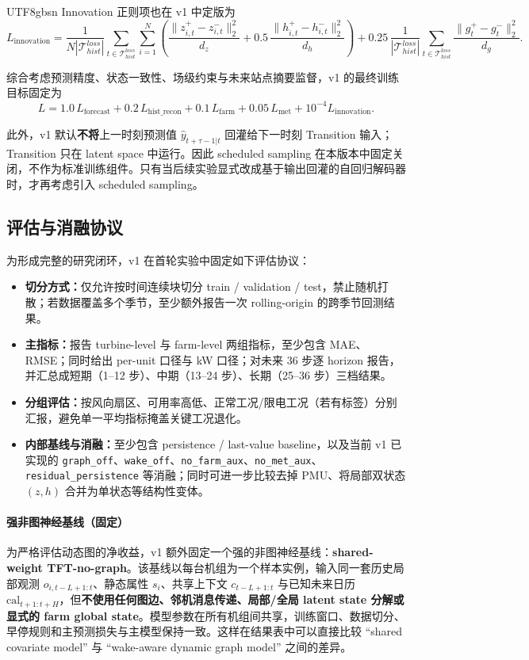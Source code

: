 \documentclass[11pt]{article}
\begin{document}
\begin{CJK}{UTF8}{gbsn}
Innovation 正则项也在 v1 中定版为
\[
L_{\mathrm{innovation}}
=
\frac{1}{N|\mathcal T_{hist}^{loss}|}
\sum_{t\in \mathcal T_{hist}^{loss}}\sum_{i=1}^{N}
\left(
\frac{\|z^+_{i,t}-z^-_{i,t}\|_2^2}{d_z}
+
0.5\,\frac{\|h^+_{i,t}-h^-_{i,t}\|_2^2}{d_h}
\right)
+
0.25\,\frac{1}{|\mathcal T_{hist}^{loss}|}
\sum_{t\in \mathcal T_{hist}^{loss}}
\frac{\|g_t^+-g_t^-\|_2^2}{d_g}.
\]

综合考虑预测精度、状态一致性、场级约束与未来站点摘要监督，v1 的最终训练目标固定为
\[
L
=
1.0\,L_{\mathrm{forecast}}
+0.2\,L_{\mathrm{hist\_recon}}
+0.1\,L_{\mathrm{farm}}
+0.05\,L_{\mathrm{met}}
+10^{-4}L_{\mathrm{innovation}}.
\]

此外，v1 默认\textbf{不将}上一时刻预测值 $\hat{y}_{t+\tau-1|t}$ 回灌给下一时刻 Transition 输入；Transition 只在 latent space 中运行。因此 scheduled sampling 在本版本中固定关闭，不作为标准训练组件。只有当后续实验显式改成基于输出回灌的自回归解码器时，才再考虑引入 scheduled sampling。

\subsection{评估与消融协议}
为形成完整的研究闭环，v1 在首轮实验中固定如下评估协议：
\begin{itemize}
  \item \textbf{切分方式：}仅允许按时间连续块切分 train / validation / test，禁止随机打散；若数据覆盖多个季节，至少额外报告一次 rolling-origin 的跨季节回测结果。
  \item \textbf{主指标：}报告 turbine-level 与 farm-level 两组指标，至少包含 MAE、RMSE；同时给出 per-unit 口径与 kW 口径；对未来 $36$ 步逐 horizon 报告，并汇总成短期（1--12 步）、中期（13--24 步）、长期（25--36 步）三档结果。
  \item \textbf{分组评估：}按风向扇区、可用率高低、正常工况/限电工况（若有标签）分别汇报，避免单一平均指标掩盖关键工况退化。
  \item \textbf{内部基线与消融：}至少包含 persistence / last-value baseline，以及当前 v1 已实现的 \texttt{graph\_off}、\texttt{wake\_off}、\texttt{no\_farm\_aux}、\texttt{no\_met\_aux}、\texttt{residual\_persistence} 等消融；同时可进一步比较去掉 PMU、将局部双状态 $(z,h)$ 合并为单状态等结构性变体。
\end{itemize}

\paragraph{强非图神经基线（固定）}
为严格评估动态图的净收益，v1 额外固定一个强的非图神经基线：\textbf{shared-weight TFT-no-graph}。该基线以每台机组为一个样本实例，输入同一套历史局部观测 $o_{i,t-L+1:t}$、静态属性 $s_i$、共享上下文 $c_{t-L+1:t}$ 与已知未来日历 $\mathrm{cal}_{t+1:t+H}$，但\textbf{不使用任何图边、邻机消息传递、局部/全局 latent state 分解或显式的 farm global state}。模型参数在所有机组间共享，训练窗口、数据切分、早停规则和主预测损失与主模型保持一致。这样在结果表中可以直接比较 ``shared covariate model'' 与 ``wake-aware dynamic graph model'' 之间的差异。


\end{CJK}
\end{document}
